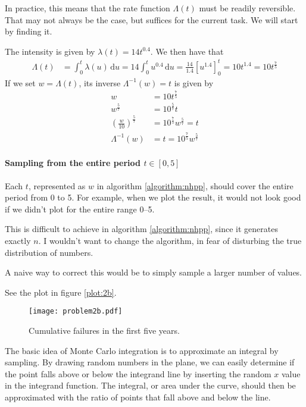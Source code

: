 \documentclass[a4paper,english,12pt]{article}
\begin{document}
In practice, this means that the rate function $\Lambda(t)$ must be readily
reversible. That may not always be the case, but suffices for the current task.
We will start by finding it.

The intensity is given by $\lambda(t) = 14t^{0.4}$. We then have that
\begin{align*}
  \Lambda(t) &= \int_0^t{\lambda(u)}\, \textrm{d}u
    =  14\int_0^t{u^{0.4}}\, \textrm{d}u
    = \frac{14}{1.4}\left[ u^{1.4} \right]_0^t = 10t^{1.4} = 10t^{\frac{7}{5}}
\end{align*}
If we set $w = \Lambda(t)$, its inverse $\Lambda^{-1}(w) = t$ is given by
\begin{align*}
  w &= 10t^{\frac{7}{5}} \\
  w^{\frac{5}{7}} &= 10^{\frac{5}{7}}t \\
      \left( \frac{w}{10} \right)^{\frac{5}{7}} 
      &= 10^{\frac{7}{5}}w^{\frac{5}{7}} = t \\
  \Lambda^{-1}(w) &= t = 10^{\frac{7}{5}}w^{\frac{5}{7}}
\end{align*}

\paragraph{Sampling from the entire period $t \in [0,5]$}
Each $t$, represented as $w$ in algorithm \vref{algorithm:nhpp}, should cover the
entire period from 0 to 5. For example, when we plot the result, it would not
look good if we didn't plot for the entire range 0--5.

This is difficult to achieve in algorithm \vref{algorithm:nhpp}, since it
generates exactly $n$. I wouldn't want to change the algorithm, in fear of
disturbing the true distribution of numbers.

A naive way to correct this would be to simply sample a larger number of
values.

See the plot in figure \vref{plot:2b}.

\begin{figure}
  \centering
  \texttt{[image: problem2b.pdf]}
  \caption{Cumulative failures in the first five years.}
  \label{plot:2b}
\end{figure}


The basic idea of Monte Carlo integration is to approximate an integral by
sampling. By drawing random numbers in the plane, we can easily determine if
the point falls above or below the integrand line by inserting the random $x$
value in the integrand function. The integral, or area under the curve, should
then be approximated with the ratio of points that fall above and below the
line.
\end{document}
